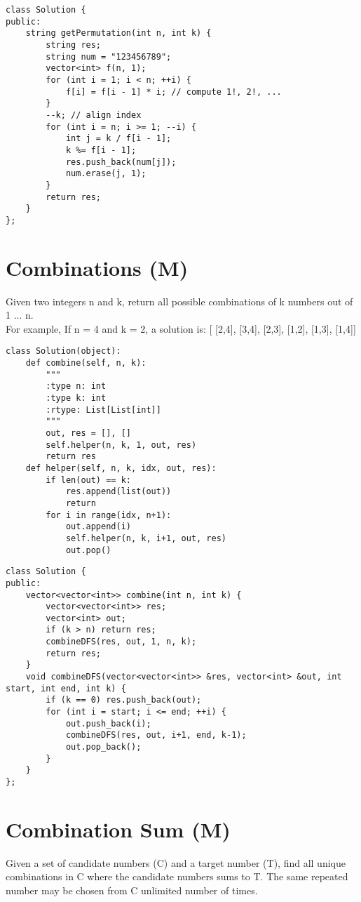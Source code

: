 \begin{lstlisting}
class Solution {
public:
    string getPermutation(int n, int k) {
        string res;
        string num = "123456789";
        vector<int> f(n, 1);
        for (int i = 1; i < n; ++i) {
            f[i] = f[i - 1] * i; // compute 1!, 2!, ...
        }
        --k; // align index
        for (int i = n; i >= 1; --i) {
            int j = k / f[i - 1];
            k %= f[i - 1];
            res.push_back(num[j]);
            num.erase(j, 1);
        }
        return res;
    }
};
\end{lstlisting}


\section{Combinations (M)}
Given two integers n and k, return all possible combinations of k numbers out of 1 ... n.\\

For example, If n = 4 and k = 2, a solution is: [ [2,4], [3,4], [2,3], [1,2], [1,3], [1,4]]\\

\begin{lstlisting}
class Solution(object):
    def combine(self, n, k):
        """
        :type n: int
        :type k: int
        :rtype: List[List[int]]
        """
        out, res = [], []
        self.helper(n, k, 1, out, res)
        return res
    def helper(self, n, k, idx, out, res):
        if len(out) == k:
            res.append(list(out))
            return
        for i in range(idx, n+1):
            out.append(i)
            self.helper(n, k, i+1, out, res)
            out.pop()
\end{lstlisting}

\begin{lstlisting}
class Solution {
public:
    vector<vector<int>> combine(int n, int k) {
        vector<vector<int>> res;
        vector<int> out;
        if (k > n) return res;
        combineDFS(res, out, 1, n, k);
        return res;
    }
    void combineDFS(vector<vector<int>> &res, vector<int> &out, int start, int end, int k) {
        if (k == 0) res.push_back(out);
        for (int i = start; i <= end; ++i) {
            out.push_back(i);
            combineDFS(res, out, i+1, end, k-1);
            out.pop_back();
        }
    }
};
\end{lstlisting}


\section{Combination Sum (M)}
Given a set of candidate numbers (C) and a target number (T), find all unique combinations in C where the candidate numbers sums to T. The same repeated number may be chosen from C unlimited number of times.\\

